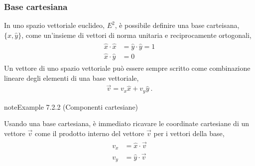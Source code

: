 \documentclass[letterpaper,10pt,italian]{jupyterBook}
\begin{document}
\subsubsection{Base cartesiana}
\label{\detokenize{ch/algebra/vector-algebra-euclidean-space-2d:base-cartesiana}}\label{\detokenize{ch/algebra/vector-algebra-euclidean-space-2d:math-hs-algebra-vector-euclidean-space-2d-cartesian-basis}}
\sphinxAtStartPar
In uno spazio vettoriale euclideo, \(E^2\), è possibile definire una base carteisana, \(\{ \hat{x}, \hat{y} \}\), come un’insieme di vettori di norma unitaria e reciprocamente ortogonali,
\begin{equation*}
\begin{split}\begin{aligned}
  \hat{x} \cdot  \hat{x} & = \hat{y} \cdot  \hat{y} = 1 \\
  \hat{x} \cdot  \hat{y} & =                          0
\end{aligned}\end{split}
\end{equation*}
\sphinxAtStartPar
Un vettore di uno spazio vettoriale può essere sempre scritto come combinazione lineare degli elementi di una base vettoriale,
\begin{equation*}
\begin{split}\vec{v} = v_x \hat{x} + v_y \hat{y} \ .\end{split}
\end{equation*}\label{ch/algebra/vector-algebra-euclidean-space-2d:example-1}
\begin{sphinxadmonition}{note}{Example 7.2.2 (Componenti cartesiane)}



\sphinxAtStartPar
Usando una base cartesiana, è immediato ricavare le coordinate cartesiane di un vettore \(\vec{v}\) come il prodotto interno del vettore \(\vec{v}\) per i vettori della base,
\begin{equation*}
\begin{split}\begin{aligned}
  v_x & = \hat{x} \cdot \vec{v} \\
  v_y & = \hat{y} \cdot \vec{v} \\
\end{aligned}\end{split}
\end{equation*}\end{sphinxadmonition}
\label{ch/algebra/vector-algebra-euclidean-space-2d:example-2}
\end{document}

